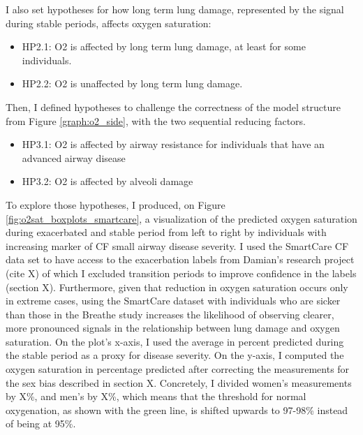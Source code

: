 I also set hypotheses for how long term lung damage, represented by the signal during stable periods, affects oxygen saturation:
\begin{itemize}
    \item HP2.1: O2 is affected by long term lung damage, at least for some individuals.
    \item HP2.2: O2 is unaffected by long term lung damage.
\end{itemize}

Then, I defined hypotheses to challenge the correctness of the model structure from Figure \ref{graph:o2_side}, with the two sequential reducing factors.
\begin{itemize}
    \item HP3.1: O2 is affected by airway resistance for individuals that have an advanced airway disease
    \item HP3.2: O2 is affected by alveoli damage
\end{itemize}

To explore those hypotheses, I produced, on Figure \ref{fig:o2sat_boxplots_smartcare}, a visualization of the predicted oxygen saturation during exacerbated and stable period from left to right by individuals with increasing marker of CF small airway disease severity. I used the SmartCare CF data set to have access to the exacerbation labels from Damian's research project (cite X) of which I excluded transition periods to improve confidence in the labels (section X). Furthermore, given that reduction in oxygen saturation occurs only in extreme cases, using the SmartCare dataset with individuals who are sicker than those in the Breathe study increases the likelihood of observing clearer, more pronounced signals in the relationship between lung damage and oxygen saturation. On the plot's x-axis, I used the average \F in percent predicted during the stable period as a proxy for disease severity. On the y-axis, I computed the oxygen saturation in percentage predicted after correcting the measurements for the sex bias described in section X. Concretely, I divided women's measurements by X\%, and men's by X\%, which means that the threshold for normal oxygenation, as shown with the green line, is shifted upwards to 97-98\% instead of being at 95\%.

